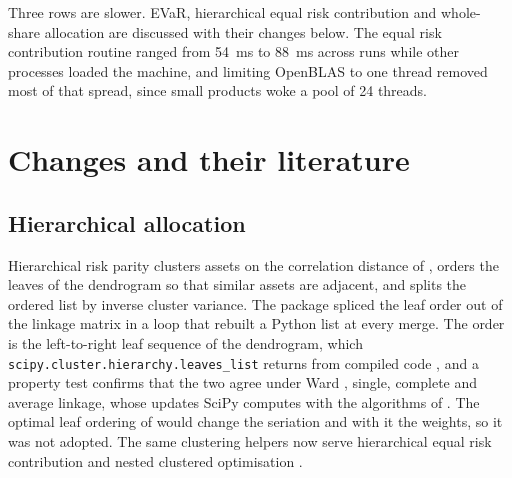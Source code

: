 Three rows are slower. EVaR, hierarchical equal risk contribution and
whole-share allocation are discussed with their changes below. The equal risk
contribution routine ranged from 54~ms to 88~ms across runs while other
processes loaded the machine, and limiting OpenBLAS to one thread removed most
of that spread, since small products woke a pool of 24 threads.

\section{Changes and their literature}
\label{app:performance:literature}

\subsection{Hierarchical allocation}

Hierarchical risk parity \citep{lopezdeprado_building_2016} clusters assets
on the correlation distance of \citet{mantegna_hierarchical_1999}, orders the
leaves of the dendrogram so that similar assets are adjacent, and splits the
ordered list by inverse cluster variance. The package spliced the leaf order
out of the linkage matrix in a loop that rebuilt a Python list at every
merge. The order is the left-to-right leaf sequence of the dendrogram, which
\texttt{scipy.cluster.hierarchy.leaves\_list} returns from compiled code
\citep{virtanen_scipy_2020}, and a property test confirms that the two agree
under Ward \citep{ward_hierarchical_1963}, single, complete and average
linkage, whose updates SciPy computes with the algorithms of
\citet{mullner_fastcluster_2013}. The optimal leaf ordering of
\citet{barjoseph_fast_2001} would change the seriation and with it the
weights, so it was not adopted. The same clustering helpers now serve
hierarchical equal risk contribution
\citep{raffinot_hierarchical_2017,raffinot_hierarchical_2018}
and nested clustered optimisation
\citep{lopezdeprado_robust_2019,lopezdeprado_machine_2020}.

